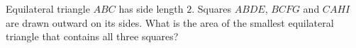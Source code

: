 Equilateral triangle $ABC$ has side length $2$. Squares $ABDE$, $BCFG$ and $CAHI$ are drawn outward on its sides. What is the area of the smallest equilateral triangle that contains all three squares?

